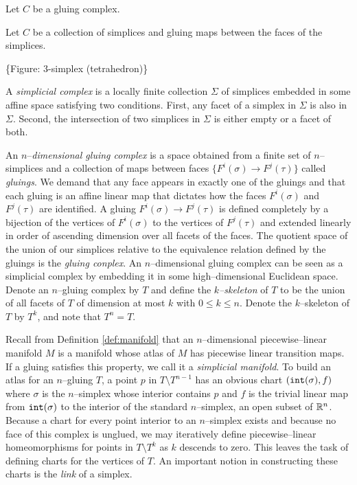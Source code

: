 Let $C$ be a gluing complex.



Let $C$ be a collection of simplices and gluing maps between the faces of the simplices.

\{Figure: 3-simplex (tetrahedron)\}


A \emph{simplicial complex} is a locally finite collection $\Sigma$ of simplices embedded in some affine space satisfying two conditions.
First, any facet of a simplex in $\Sigma$ is also in $\Sigma$.
Second, the intersection of two simplices in $\Sigma$ is either empty or a facet of both.

An $n$--\emph{dimensional gluing complex} is a space obtained from a finite set of $n$--simplices and a collection of maps between faces $\{F^i(\sigma)\to F^j(\tau)\}$ called \emph{gluings}.
We demand that any face appears in exactly one of the gluings and that each gluing is an affine linear map that dictates how the faces $F^i(\sigma)$ and $F^j(\tau)$ are identified.
A gluing $F^i(\sigma)\to F^j(\tau)$ is defined completely by a bijection of the vertices of $F^i(\sigma)$ to the vertices of $F^j(\tau)$ and extended linearly in order of ascending dimension over all facets of the faces.
The quotient space of the union of our simplices relative to the equivalence relation defined by the gluings is the \emph{gluing conplex}.
An $n$--dimensional gluing complex can be seen as a simplicial complex by embedding it in some high--dimensional Euclidean space.
Denote an $n$--gluing complex by $T$ and define the \emph{$k$--skeleton} of $T$ to be the union of all facets of $T$ of dimension at most $k$ with $0\leq k\leq n$.
Denote the $k$--skeleton of $T$ by $T^k$, and note that $T^n=T$.




Recall from Definition \ref{def:manifold} that an $n$--dimensional piecewise--linear manifold $M$ is a manifold whose atlas of $M$ has piecewise linear transition maps.
If a gluing satisfies this property, we call it a \emph{simplicial manifold}.
To build an atlas for an $n$--gluing $T$, a point $p$ in $T\setminus T^{n-1}$ has an obvious chart $(\mathtt{int}(\sigma),f)$ where $\sigma$ is the $n$--simplex whose interior contains $p$ and $f$ is the trivial linear map from $\mathtt{int}(\sigma)$ to the interior of the standard $n$--simplex, an open subset of $\mathbb{R}^n$.
Because a chart for every point interior to an $n$--simplex exists and because no face of this complex is unglued, we may iteratively define piecewise--linear homeomorphisms for points in $T\setminus T^{k}$ as $k$ descends to zero.
This leaves the task of defining charts for the vertices of $T$.
An important notion in constructing these charts is the \emph{link} of a simplex.

